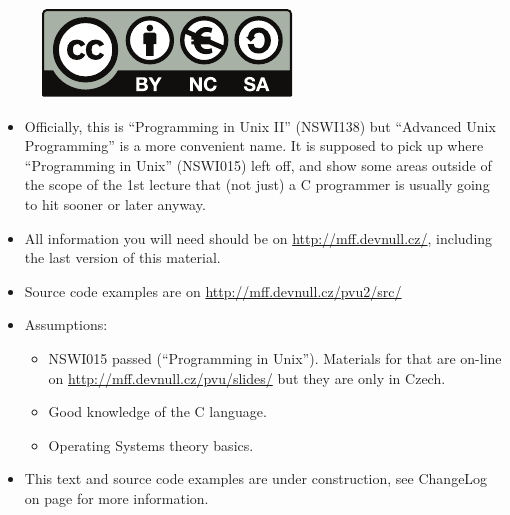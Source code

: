
\maketitle

\begin{figure}[htb!]
  \begin{center}
  \href{http://creativecommons.org/licenses/by-nc-sa/3.0/}{%
    \includegraphics{img/by-nc-sa_eu.pdf}}
  \end{center}
  \end{figure}

\newpage
\tableofcontents
\newpage

\begin{itemize}
\item Officially, this is ``Programming in Unix II'' (NSWI138) but ``Advanced
Unix Programming'' is a more convenient name. It is supposed to pick up where
``Programming in Unix'' (NSWI015) left off, and show some areas outside of the
scope of the 1st lecture that (not just) a C programmer is usually going to hit
sooner or later anyway.
\item All information you will need should be on
\url{http://mff.devnull.cz/}, in\-clu\-ding the last version of this material.
\item Source code examples are on \url{http://mff.devnull.cz/pvu2/src/}
\item Assumptions:
  \begin{itemize}
  \item NSWI015 passed (``Programming in Unix''). Materials for that are
  on-line on \url{http://mff.devnull.cz/pvu/slides/} but they are only in
  Czech.
  \item Good knowledge of the C language.
  \item Operating Systems theory basics.
  \end{itemize}
\item This text and source code examples are under construction, see ChangeLog
on page \pageref{CHANGELOG} for more information.
\end{itemize}

